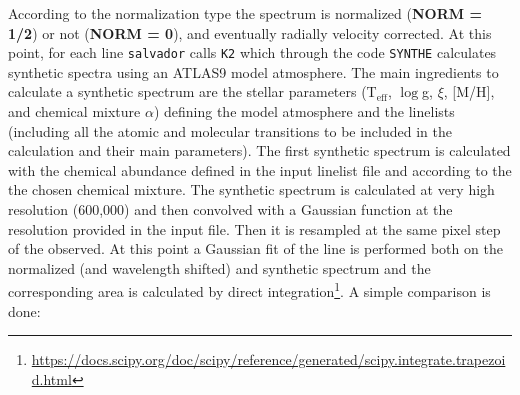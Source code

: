\documentclass[modern]{aastex701}
\begin{document}
According to the normalization type the spectrum is normalized ({\bf NORM = 1/2}) or not ({\bf NORM = 0}), and eventually radially velocity corrected. At this point, for each line \texttt{salvador} calls \texttt{K2} which through the code \texttt{SYNTHE} calculates synthetic spectra using an ATLAS9 model atmosphere. The main ingredients to calculate a synthetic spectrum are the stellar parameters (T$_{\mathrm{eff}}$, $\log$g, $\xi$, [M/H], and chemical mixture $\alpha$) defining the model atmosphere and the linelists (including all the atomic and molecular transitions to be included in the calculation and their main parameters). The first synthetic spectrum is calculated with the chemical abundance defined in the input linelist file and according to the the chosen chemical mixture. The synthetic spectrum is calculated at very high resolution (600,000) and then convolved with a Gaussian function at the resolution provided in the input file. Then it is resampled at the same pixel step of the observed. At this point a Gaussian fit of the line is performed both on the normalized (and wavelength shifted) and synthetic spectrum and the corresponding area is calculated by direct integration\footnote{\url{https://docs.scipy.org/doc/scipy/reference/generated/scipy.integrate.trapezoid.html}}.  A simple comparison is done:
\end{document}
